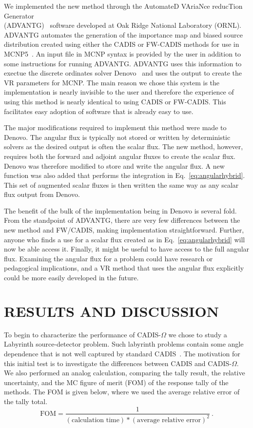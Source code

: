 \documentclass[12pt]{article}
\begin{document}
We implemented the new method through the AutomateD VAriaNce reducTion Generator\\ (ADVANTG)~\cite{wagner_automated_2002, mosher_new_2010} software developed at Oak Ridge National Laboratory (ORNL). 
ADVANTG automates the generation of the importance map and biased source distribution created using either the CADIS or FW-CADIS methods for use in MCNP5~\cite{brown_mcnp_2002}. 
An input file in MCNP syntax is provided by the user in addition to some instructions for running ADVANTG. 
ADVANTG uses this information to exectue the discrete ordinates solver Denovo~\cite{evans_denovo:_2010} and uses the output to create the VR parameters for MCNP.
The main reason we chose this system is the implementation is nearly invisible to the user and therefore the experience of using this method is nearly identical to using CADIS or FW-CADIS.
This facilitates easy adoption of software that is already easy to use.

The major modifications required to implement this method were made to Denovo. 
The angular flux is typically not stored or written by deterministic solvers as the desired output is often the scalar flux.
The new method, however, requires both the forward and adjoint angular fluxes to create the scalar flux. 
Denovo was therefore modified to store and write the angular flux.
A new function was also added that performs the integration in Eq.~\eqref{eq:angularhybrid}. 
This set of augmented scalar fluxes is then written the same way as any scalar flux output from Denovo.

The benefit of the bulk of the implementation being in Denovo is several fold. 
From the standpoint of ADVANTG, there are very few differences between the new method and FW/CADIS, making implementation straightforward.
Further, anyone who finds a use for a scalar flux created as in Eq.~\eqref{eq:angularhybrid} will now be able  access it.
Finally, it might be useful to have access to the full angular flux. 
Examining the angular flux for a problem could have research or pedagogical implications, and a VR method that uses the angular flux explicitly could be more easily developed in the future.

\section{RESULTS AND DISCUSSION} 
\label{sect::results}

To begin to characterize the performance of CADIS-$\Omega$ we chose to study a Labyrinth source-detector problem.
Such labyrinth problems contain some angle dependence that is not well captured by standard CADIS~\cite{peplow_consistent_2012}. 
The motivation for this initial test is to investigate the differences between CADIS and CADIS-$\Omega$.
We also performed an analog calculation, comparing  the tally result, the relative uncertainty, and the MC figure of merit (FOM) of the response tally of the methods.
The FOM is given below, where we used the average relative error of the tally total.
\[\text{FOM} = \frac{1}{(\text{calculation time})*(\text{average relative error})^2}\:. \]
\end{document}
